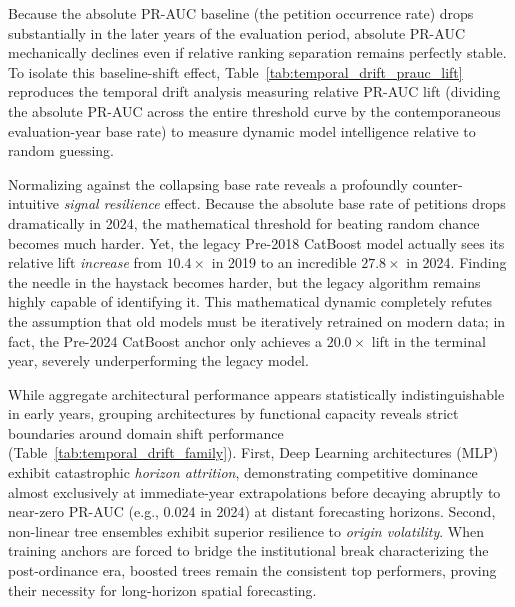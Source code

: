 \documentclass[twoside,11pt]{article}
\begin{document}
\vspace{1em}


\noindent Because the absolute PR-AUC baseline (the petition occurrence rate) drops substantially in the later years of the evaluation period, absolute PR-AUC mechanically declines even if relative ranking separation remains perfectly stable. To isolate this baseline-shift effect, Table~\ref{tab:temporal_drift_prauc_lift} reproduces the temporal drift analysis measuring relative PR-AUC lift (dividing the absolute PR-AUC across the entire threshold curve by the contemporaneous evaluation-year base rate) to measure dynamic model intelligence relative to random guessing.



Normalizing against the collapsing base rate reveals a profoundly counter-intuitive \textit{signal resilience} effect. Because the absolute base rate of petitions drops dramatically in 2024, the mathematical threshold for beating random chance becomes much harder. Yet, the legacy Pre-2018 CatBoost model actually sees its relative lift \textit{increase} from $10.4\times$ in 2019 to an incredible $27.8\times$ in 2024. Finding the needle in the haystack becomes harder, but the legacy algorithm remains highly capable of identifying it. This mathematical dynamic completely refutes the assumption that old models must be iteratively retrained on modern data; in fact, the Pre-2024 CatBoost anchor only achieves a $20.0\times$ lift in the terminal year, severely underperforming the legacy model.

\vspace{1em}
While aggregate architectural performance appears statistically indistinguishable in early years, grouping architectures by functional capacity reveals strict boundaries around domain shift performance (Table~\ref{tab:temporal_drift_family}). First, Deep Learning architectures (MLP) exhibit catastrophic \textit{horizon attrition}, demonstrating competitive dominance almost exclusively at immediate-year extrapolations before decaying abruptly to near-zero PR-AUC (e.g., 0.024 in 2024) at distant forecasting horizons. Second, non-linear tree ensembles exhibit superior resilience to \textit{origin volatility}. When training anchors are forced to bridge the institutional break characterizing the post-ordinance era, boosted trees remain the consistent top performers, proving their necessity for long-horizon spatial forecasting.
\end{document}
